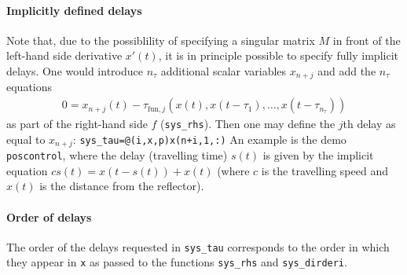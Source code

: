 \documentclass[10pt]{scrartcl}
\newcommand{\blist}[1]{\mbox{\lstinline!#1!}}
\begin{document}
\paragraph{Implicitly defined delays}
Note that, due to the possiblility of specifying a singular matrix $M$
in front of the left-hand side derivative $x'(t)$, it is in principle
possible to specify fully implicit delays. One would introduce $n_\tau$
additional scalar variables $x_{n+j}$ and add the $n_\tau$ equations 
\begin{align*}
  0=x_{n+j}(t)-\tau_{\mathrm{fun},j}(x(t),x(t-\tau_1),\ldots,x(t-\tau_{n_\tau}))
\end{align*}
as part of the right-hand side $f$ (\blist{sys_rhs}). Then one may
define the $j$th delay as equal to $x_{n+j}$:
\blist{sys_tau=@(i,x,p)x(n+i,1,:)} An example is the demo
\blist{poscontrol}, where the delay (travelling time) $s(t)$ is given
by the implicit equation $cs(t)=x(t-s(t))+x(t)$ (where $c$ is the
travelling speed and $x(t)$ is the distance from the reflector).

\paragraph{Order of delays} The order of the delays
requested in \blist{sys_tau} corresponds to the order in which they
appear in \blist{x} as passed to the functions \blist{sys_rhs} and
\blist{sys_dirderi}.
\end{document}

